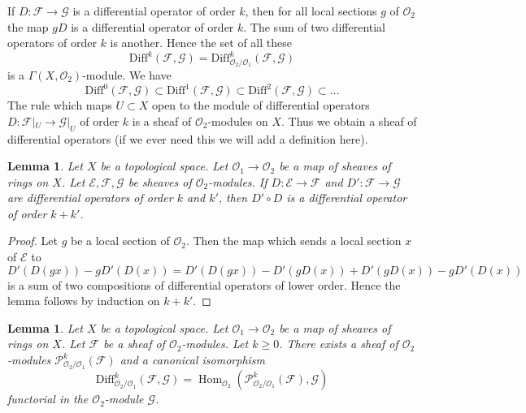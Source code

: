 \documentclass{stacks-project}
\theoremstyle{plain}
\newtheorem{lemma}[subsection]{Lemma}
\theoremstyle{definition}
\theoremstyle{remark}
\numberwithin{equation}{subsection}
\def\Hom{\mathop{\mathrm{Hom}}\nolimits}
\begin{document}
\noindent
If $D : \mathcal{F} \to \mathcal{G}$ is a differential operator of order $k$,
then for all local sections $g$ of $\mathcal{O}_2$ the map $gD$ is a
differential operator of order $k$. The sum of two differential operators of
order $k$ is another. Hence the set of all these
$$
\text{Diff}^k(\mathcal{F}, \mathcal{G}) =
\text{Diff}^k_{\mathcal{O}_2/\mathcal{O}_1}(\mathcal{F}, \mathcal{G})
$$
is a $\Gamma(X, \mathcal{O}_2)$-module. We have
$$
\text{Diff}^0(\mathcal{F}, \mathcal{G}) \subset
\text{Diff}^1(\mathcal{F}, \mathcal{G}) \subset
\text{Diff}^2(\mathcal{F}, \mathcal{G}) \subset \ldots
$$
The rule which maps $U \subset X$ open to the module of
differential operators $D : \mathcal{F}|_U \to \mathcal{G}|_U$
of order $k$ is a sheaf of $\mathcal{O}_2$-modules on $X$.
Thus we obtain a sheaf of differential operators (if we ever need this we will
add a definition here).

\begin{lemma}
\label{lemma-composition-differential-operators}
Let $X$ be a topological space.
Let $\mathcal{O}_1 \to \mathcal{O}_2$ be a map of sheaves of rings on $X$.
Let $\mathcal{E}, \mathcal{F}, \mathcal{G}$ be sheaves of
$\mathcal{O}_2$-modules.
If $D : \mathcal{E} \to \mathcal{F}$ and $D' : \mathcal{F} \to \mathcal{G}$
are differential operators of order $k$ and $k'$, then $D' \circ D$ is a
differential operator of order $k + k'$.
\end{lemma}

\begin{proof}
Let $g$ be a local section of $\mathcal{O}_2$.
Then the map which sends a local section $x$ of $\mathcal{E}$ to
$$
D'(D(gx)) - gD'(D(x)) = D'(D(gx)) - D'(gD(x)) + D'(gD(x)) - gD'(D(x))
$$
is a sum of two compositions of differential operators of lower order.
Hence the lemma follows by induction on $k + k'$.
\end{proof}

\begin{lemma}
\label{lemma-module-principal-parts}
Let $X$ be a topological space.
Let $\mathcal{O}_1 \to \mathcal{O}_2$ be a map of sheaves of rings on $X$.
Let $\mathcal{F}$ be a sheaf of $\mathcal{O}_2$-modules.
Let $k \geq 0$. There exists a sheaf of $\mathcal{O}_2$-modules
$\mathcal{P}^k_{\mathcal{O}_2/\mathcal{O}_1}(\mathcal{F})$
and a canonical isomorphism
$$
\text{Diff}^k_{\mathcal{O}_2/\mathcal{O}_1}(\mathcal{F}, \mathcal{G}) =
\Hom_{\mathcal{O}_2}(
\mathcal{P}^k_{\mathcal{O}_2/\mathcal{O}_1}(\mathcal{F}), \mathcal{G})
$$
functorial in the $\mathcal{O}_2$-module $\mathcal{G}$.
\end{lemma}
\end{document}
